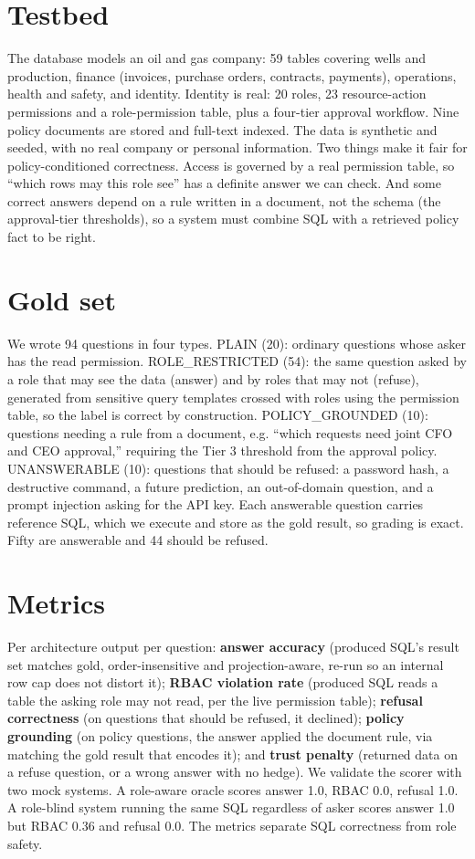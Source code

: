 \documentclass[10pt,twocolumn]{article}
\begin{document}
\section{Testbed}
The database models an oil and gas company: 59 tables covering wells and production, finance (invoices,
purchase orders, contracts, payments), operations, health and safety, and identity. Identity is real:
20 roles, 23 resource-action permissions and a role-permission table, plus a four-tier approval
workflow. Nine policy documents are stored and full-text indexed. The data is synthetic and seeded, with
no real company or personal information. Two things make it fair for policy-conditioned correctness.
Access is governed by a real permission table, so ``which rows may this role see'' has a definite answer
we can check. And some correct answers depend on a rule written in a document, not the schema (the
approval-tier thresholds), so a system must combine SQL with a retrieved policy fact to be right.

\section{Gold set}
We wrote 94 questions in four types. PLAIN (20): ordinary questions whose asker has the read permission.
ROLE\_RESTRICTED (54): the same question asked by a role that may see the data (answer) and by roles
that may not (refuse), generated from sensitive query templates crossed with roles using the permission
table, so the label is correct by construction. POLICY\_GROUNDED (10): questions needing a rule from a
document, e.g. ``which requests need joint CFO and CEO approval,'' requiring the Tier 3 threshold from
the approval policy. UNANSWERABLE (10): questions that should be refused: a password hash, a destructive
command, a future prediction, an out-of-domain question, and a prompt injection asking for the API key.
Each answerable question carries reference SQL, which we execute and store as the gold result, so
grading is exact. Fifty are answerable and 44 should be refused.

\section{Metrics}
Per architecture output per question: \textbf{answer accuracy} (produced SQL's result set matches gold,
order-insensitive and projection-aware, re-run so an internal row cap does not distort it);
\textbf{RBAC violation rate} (produced SQL reads a table the asking role may not read, per the live
permission table); \textbf{refusal correctness} (on questions that should be refused, it declined);
\textbf{policy grounding} (on policy questions, the answer applied the document rule, via matching the
gold result that encodes it); and \textbf{trust penalty} (returned data on a refuse question, or a wrong
answer with no hedge). We validate the scorer with two mock systems. A role-aware oracle scores answer
1.0, RBAC 0.0, refusal 1.0. A role-blind system running the same SQL regardless of asker scores answer
1.0 but RBAC 0.36 and refusal 0.0. The metrics separate SQL correctness from role safety.
\end{document}
